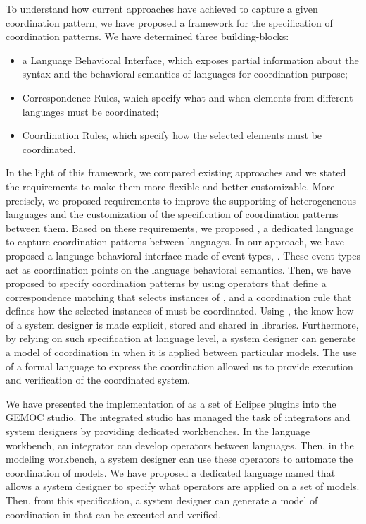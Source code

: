 To understand how current approaches have achieved to capture a given coordination pattern, we have proposed a framework for the specification of coordination patterns. We have determined three building-blocks: 
	\begin{itemize}
	\item a Language Behavioral Interface, which exposes partial information about the syntax and the behavioral semantics of languages for coordination purpose; 
	
	\item Correspondence Rules, which specify what and when elements from different languages must be coordinated;
	
	\item Coordination Rules, which specify how the selected elements must be coordinated. 
\end{itemize}

In the light of this framework, we compared existing approaches and we stated the requirements to make them more flexible and better customizable. More precisely, we proposed requirements to improve the supporting of heterogenenous languages and the customization of the specification of coordination patterns between them. Based on these requirements, we proposed \bcool, a dedicated language to capture coordination patterns between languages. In our approach, we have proposed a language behavioral interface made of event types, \ie \dse. These event types act as coordination points on the language behavioral semantics. Then, we have proposed to specify coordination patterns by using operators that define a correspondence matching that selects instances of \dse, and a coordination rule that defines how the selected instances of \dse must be coordinated. Using \bcool, the know-how of a system designer is made explicit, stored and shared in libraries. Furthermore, by relying on such specification at language level, a system designer can generate a model of coordination in \ccsl when it is applied between particular models. The use of a formal language to express the coordination allowed us to provide execution and verification of the coordinated system.
	
We have presented the implementation of \bcool as a set of Eclipse plugins into the GEMOC studio. The integrated studio has managed the task of integrators and system designers by providing dedicated workbenches. In the language workbench, an integrator can develop operators between languages. Then, in the modeling workbench, a system designer can use these operators to automate the coordination of models. We have proposed a dedicated language named \bflow that allows a system designer to specify what operators are applied on a set of models. Then, from this specification, a system designer can generate a model of coordination in \ccsl that can be executed and verified.  
	
